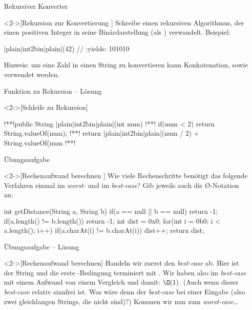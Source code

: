\begin{frame}[fragile,c]{Rekursiver Konverter}
    \begin{exercise}<2->[Rekursion zur Konvertierung ]
        \pause{}Schreibe einen rekursiven Algorithmus, der einen positiven Integer in seine Binärdarstellung (als ) verwandelt.\pause{}
        Beispiel:\pause{}
\begin{plainjava}
|plain|int2bin|plain|(42) // :yields: 101010
\end{plainjava}
    \pause{}Hinweis: um eine Zahl in einen String zu konvertieren kann Konkatenation,\pause{} sowie  verwendet werden.
    \end{exercise}
\end{frame}

\begin{frame}[fragile,c]{Funktion zu Rekursion -- Lösung}
    \begin{solve}<2->[Schleife zu Rekursion]
\begin{plainjava}
!**!public String |plain|int2bin|plain|(int num){
!**!    if(num < 2) return String.valueOf(num);
!**!    return |plain|int2bin|plain|(num / 2) + String.valueOf(num %
!**!}
\end{plainjava}
    \end{solve}
\end{frame}


\begin{frame}[fragile,c]{Übungsaufgabe}
    \begin{exercise}<2->[Rechenaufwand berechnen ]
        \pause{}Wie viele Rechenschritte benötigt das folgende Verfahren einmal im \emph{worst-} und im \emph{best-case}? Gib jeweils auch die \O-Notation an: \pause{}
\begin{plainjava}
int getDistance(String a, String b){
    if(a == null || b == null) return -1;
    if(a.length() != b.length()) return -1;
    int dist = 0x0;
    for(int i = 0b0; i < a.length(); i++)
        if(a.charAt(i) != b.charAt(i))
            dist++;
    return dist;
}
\end{plainjava}
    \end{exercise}
\end{frame}

\begin{frame}[c]{Übungsaufgabe -- Lösung}
    \begin{solve}<2->[Rechenaufwand berechnen]
    \pause{}Handeln wir zuerst den \emph{best-case} ab.\pause{} Hier ist der String   und die erste -Bedingung terminiert mit .\pause{} Wir haben also im \emph{best-case} mit einem Aufwand von einem Vergleich und damit: \(\O(1)\).\pause{} (Auch wenn dieser \emph{best-case} relativ sinnfrei ist.\pause{} Was wäre denn der \emph{best-case} bei einer  Eingabe\pause{} (also zwei gleichlangen Strings, die nicht  sind)?)\pause{} Kommen wir nun zum \emph{worst-case}\ldots
    \end{solve}
\end{frame}

